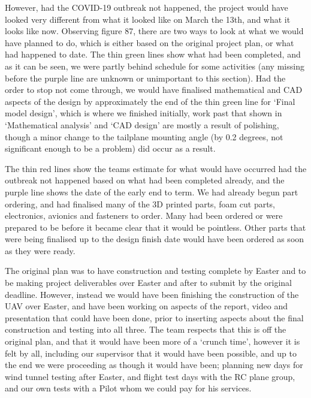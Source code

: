 \documentclass[../../main.tex]{subfiles}
\begin{document}
However, had the COVID-19 outbreak not happened, the project would have looked very different from what it looked like on March the 13th, and what it looks like now.
Observing figure 87, there are two ways to look at what we would have planned to do, which is either based on the original project plan, or what had happened to date.
The thin green lines show what had been completed, and as it can be seen, we were partly behind schedule for some activities (any missing before the purple line are unknown or unimportant to this section).
Had the order to stop not come through, we would have finalised mathematical and CAD aspects of the design by approximately the end of the thin green line for ‘Final model design’, which is where we finished initially, work past that shown in ‘Mathematical analysis’ and ‘CAD design’ are mostly a result of polishing, though a minor change to the tailplane mounting angle (by 0.2 degrees, not significant enough to be a problem) did occur as a result.  

The thin red lines show the teams estimate for what would have occurred had the outbreak not happened based on what had been completed already, and the purple line shows the date of the early end to term.
We had already begun part ordering, and had finalised many of the 3D printed parts, foam cut parts, electronics, avionics and fasteners to order.
Many had been ordered or were prepared to be before it became clear that it would be pointless.
Other parts that were being finalised up to the design finish date would have been ordered as soon as they were ready.  


The original plan was to have construction and testing complete by Easter and to be making project deliverables over Easter and after to submit by the original deadline.
However, instead we would have been finishing the construction of the UAV over Easter, and have been working on aspects of the report, video and presentation that could have been done, prior to inserting aspects about the final construction and testing into all three.
The team respects that this is off the original plan, and that it would have been more of a ‘crunch time’, however it is felt by all, including our supervisor that it would have been possible, and up to the end we were proceeding as though it would have been; planning new days for wind tunnel testing after Easter, and flight test days with the RC plane group, and our own tests with a Pilot whom we could pay for his services.  
\end{document}
